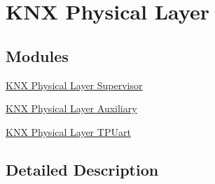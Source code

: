 \hypertarget{group___k_n_x___p_h}{}\section{K\+NX Physical Layer}
\label{group___k_n_x___p_h}
\subsection*{Modules}
\begin{DoxyCompactItemize}
\item 
\hyperlink{group___k_n_x___p_h___sup}{K\+N\+X Physical Layer Supervisor}
\item 
\hyperlink{group___k_n_x___aux}{K\+N\+X Physical Layer Auxiliary}
\item 
\hyperlink{group___k_n_x___p_h___t_p_uart}{K\+N\+X Physical Layer T\+P\+Uart}
\end{DoxyCompactItemize}


\subsection{Detailed Description}
